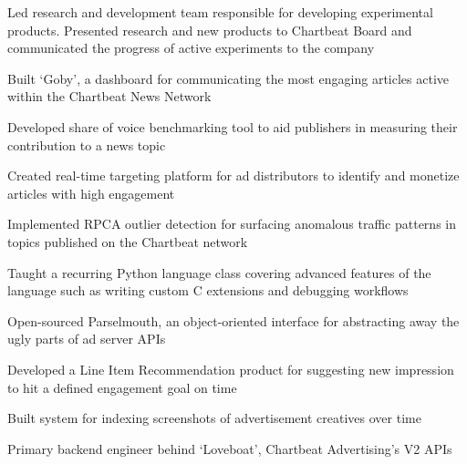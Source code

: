 \documentclass[]{resume-openfont}
\begin{document}
    \begin{tightemize}
        \item
            Led research and development team responsible for developing
            experimental products. Presented research and new products to
            Chartbeat Board and communicated the progress of active experiments
            to the company
        \item
            Built `Goby', a dashboard for communicating the most engaging
            articles active within the Chartbeat News Network
        \item
            Developed share of voice benchmarking tool to aid publishers in
            measuring their contribution to a news topic
        \item
            Created real-time targeting platform for ad distributors to
            identify and monetize articles with high engagement
        \item
            Implemented RPCA outlier detection for surfacing anomalous traffic
            patterns in topics published on the Chartbeat network
        \item
            Taught a recurring Python language class covering advanced features
            of the language such as writing custom C extensions and debugging
            workflows
    \end{tightemize}
    \vspace{5pt}

    \begin{tightemize}
        \item
            Open-sourced Parselmouth, an object-oriented interface for
            abstracting away the ugly parts of ad server APIs
        \item
            Developed a Line Item Recommendation product for suggesting new
            impression to hit a defined engagement goal on time
        \item
            Built system for indexing screenshots of advertisement creatives
            over time
        \item
            Primary backend engineer behind `Loveboat', Chartbeat Advertising's
            V2 APIs
    \end{tightemize}
\end{document}
